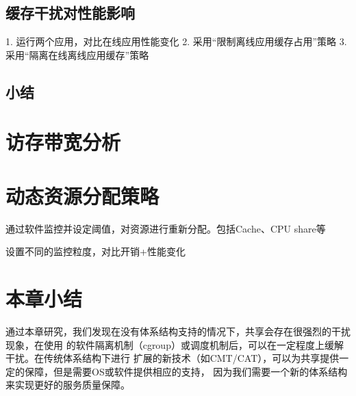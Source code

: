\subsection{缓存干扰对性能影响}

1. 运行两个应用，对比在线应用性能变化
2. 采用“限制离线应用缓存占用”策略
3. 采用“隔离在线离线应用缓存”策略

\subsection{小结}

\section{访存带宽分析}

\section{动态资源分配策略}

通过软件监控并设定阈值，对资源进行重新分配。包括Cache、CPU share等

设置不同的监控粒度，对比开销+性能变化



\section{本章小结}

通过本章研究，我们发现在没有体系结构支持的情况下，共享会存在很强烈的干扰现象，在使用
的软件隔离机制（cgroup）或调度机制后，可以在一定程度上缓解干扰。在传统体系结构下进行
扩展的新技术（如CMT/CAT），可以为共享提供一定的保障，但是需要OS或软件提供相应的支持，
因为我们需要一个新的体系结构来实现更好的服务质量保障。

\fi

